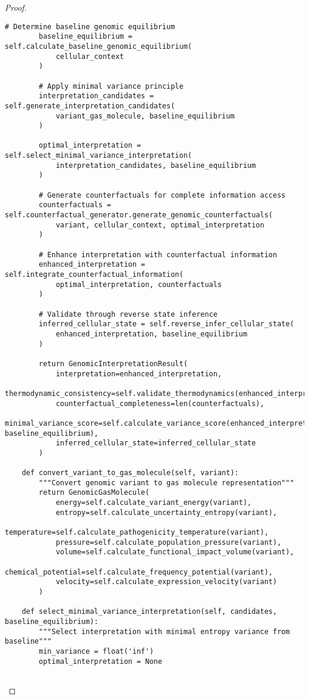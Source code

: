 \documentclass[12pt,a4paper]{article}
\begin{document}
\begin{proof}
\begin{lstlisting}[style=pythonstyle, caption=Gas Molecular Enhanced Genomic Processing]
        # Determine baseline genomic equilibrium
        baseline_equilibrium = self.calculate_baseline_genomic_equilibrium(
            cellular_context
        )
        
        # Apply minimal variance principle
        interpretation_candidates = self.generate_interpretation_candidates(
            variant_gas_molecule, baseline_equilibrium
        )
        
        optimal_interpretation = self.select_minimal_variance_interpretation(
            interpretation_candidates, baseline_equilibrium
        )
        
        # Generate counterfactuals for complete information access
        counterfactuals = self.counterfactual_generator.generate_genomic_counterfactuals(
            variant, cellular_context, optimal_interpretation
        )
        
        # Enhance interpretation with counterfactual information
        enhanced_interpretation = self.integrate_counterfactual_information(
            optimal_interpretation, counterfactuals
        )
        
        # Validate through reverse state inference
        inferred_cellular_state = self.reverse_infer_cellular_state(
            enhanced_interpretation, baseline_equilibrium
        )
        
        return GenomicInterpretationResult(
            interpretation=enhanced_interpretation,
            thermodynamic_consistency=self.validate_thermodynamics(enhanced_interpretation),
            counterfactual_completeness=len(counterfactuals),
            minimal_variance_score=self.calculate_variance_score(enhanced_interpretation, baseline_equilibrium),
            inferred_cellular_state=inferred_cellular_state
        )
    
    def convert_variant_to_gas_molecule(self, variant):
        """Convert genomic variant to gas molecule representation"""
        return GenomicGasMolecule(
            energy=self.calculate_variant_energy(variant),
            entropy=self.calculate_uncertainty_entropy(variant),
            temperature=self.calculate_pathogenicity_temperature(variant),
            pressure=self.calculate_population_pressure(variant),
            volume=self.calculate_functional_impact_volume(variant),
            chemical_potential=self.calculate_frequency_potential(variant),
            velocity=self.calculate_expression_velocity(variant)
        )
    
    def select_minimal_variance_interpretation(self, candidates, baseline_equilibrium):
        """Select interpretation with minimal entropy variance from baseline"""
        min_variance = float('inf')
        optimal_interpretation = None
        

\end{lstlisting}
\end{proof}
\end{document}
